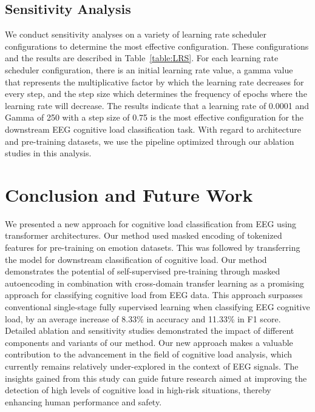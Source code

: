 \documentclass[sigconf]{acmart}
\begin{document}
\subsection{Sensitivity Analysis}

We conduct sensitivity analyses on a variety of learning rate scheduler configurations to determine the most effective configuration. These configurations and the results are described in Table~\ref{table:LRS}. For each learning rate scheduler configuration, there is an initial learning rate value, a gamma value that represents the multiplicative factor by which the learning rate decreases for every step, and the step size which determines the frequency of epochs where the learning rate will decrease. The results indicate that a learning rate of 0.0001 and Gamma of 250 with a step size of 0.75 is the most effective configuration for the downstream EEG cognitive load classification task. With regard to architecture and pre-training datasets, we use the pipeline optimized through our ablation studies in this analysis. 



\section{Conclusion and Future Work} \label{Conclusion&FutureWork}
We presented a new approach for cognitive load classification from EEG using transformer architectures. Our method used masked encoding of tokenized features for pre-training on emotion datasets. This was followed by transferring the model for downstream classification of cognitive load. Our method demonstrates the potential of self-supervised pre-training through masked autoencoding in combination with cross-domain transfer learning as a promising approach for classifying cognitive load from EEG data. This approach surpasses conventional single-stage fully supervised learning when classifying EEG cognitive load, by an average increase of 8.33\% in accuracy and 11.33\% in F1 score. Detailed ablation and sensitivity studies demonstrated the impact of different components and variants of our method. Our new approach makes a valuable contribution to the advancement in the field of cognitive load analysis, which currently remains relatively under-explored in the context of EEG signals. The insights gained from this study can guide future research aimed at improving the detection of high levels of cognitive load in high-risk situations, thereby enhancing human performance and safety.
\end{document}
